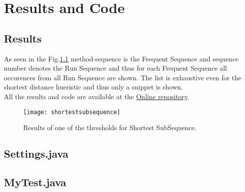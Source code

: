 
\chapter{Results and Code} %

\label{AppendixA} %


\section{Results}
As seen in the Fig.\ref{shortestsubsequence} method-sequence is the Frequent Sequence and sequence number denotes the Run Sequence and thus for each Frequent Sequence all occurences from all Run Sequence are shown. The list is exhaustive even for the shortest distance hueristic and thus only a snippet is shown.\\
All the results and code are available at the \href{https://github.com/kushshah/TestProcessing}{Online repository}.\\
\begin{figure}[h]
 \texttt{[image: shortestsubsequence]}
\caption{Results of one of the thresholds for Shortest SubSequence.}
\label{shortestsubsequence}
\end{figure}

\section{Settings.java}


\section{MyTest.java}
